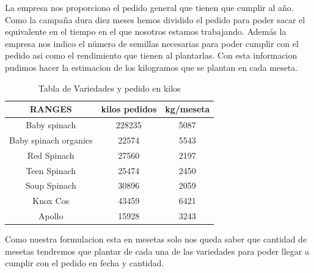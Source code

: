 La empresa nos proporciono el pedido general que tienen que cumplir al año. Como la campaña dura diez meses hemos dividido el pedido 
para poder sacar el equivalente en el tiempo en el que nosotros estamos trabajando. Además la empresa nos indico el número de semillas
necesarias para poder cumplir con el pedido asi como el rendimiento que tienen al plantarlas. Con esta informacion pudimos hacer la estimacion 
de los kilogramos que se plantan en cada meseta.
\begin{table}[ht!]
    \centering
    \begin{minipage}{0.48\textwidth}
        \centering
        \begin{tabular}{|c|c|c|}
            \hline
            \rowcolor{gray!30} \textbf{\textcolor{grey3}{RANGES}} & \textbf{\textcolor{grey3}{kilos pedidos}} & \textbf{\textcolor{grey3}{kg/meseta}}\\            \hline
            Baby spinach   & 228235 & 5087\\ \hline
            Baby spinach organics  & 22574 & 5543\\ \hline
            Red Spinach              & 27560 & 2197\\ \hline
            Teen Spinach           & 25474 & 2450\\ \hline
            Soup Spinach & 30896 & 2059\\ \hline
            Knox Cos     & 43459 & 6421\\ \hline
            Apollo      & 15928 & 3243 \\ \hline
             
            \hline
        \end{tabular}
        \caption{Tabla de Variedades y pedido en kilos}
        \label{tab:Variedades-kilos}
    \end{minipage}
    \hfill
\end{table}

 Como nuestra formulacion esta en mesetas solo nos queda saber que cantidad de mesetas tendremos que plantar de cada una de las variedades
 para poder llegar a cumplir con el pedido en fecha y cantidad. 
 
